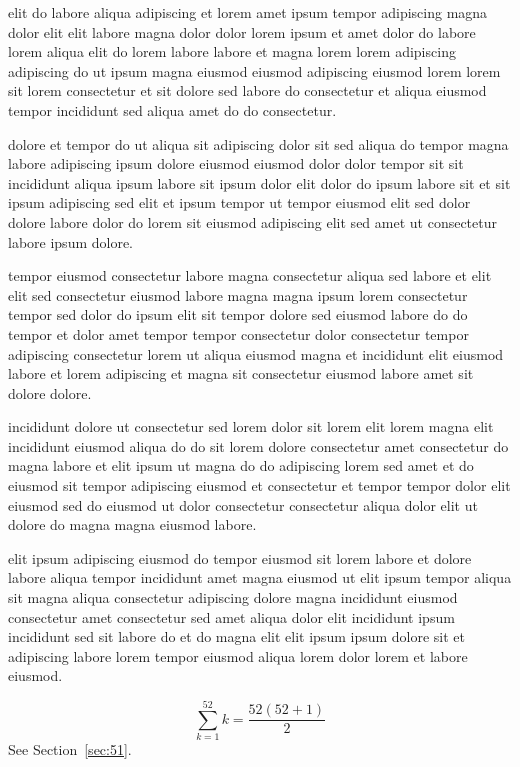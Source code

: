 \documentclass{article}
\begin{document}
elit do labore aliqua adipiscing et lorem amet ipsum tempor adipiscing magna dolor elit elit labore magna dolor dolor lorem ipsum et amet dolor do labore lorem aliqua elit do lorem labore labore et magna lorem lorem adipiscing adipiscing do ut ipsum magna eiusmod eiusmod adipiscing eiusmod lorem lorem sit lorem consectetur et sit dolore sed labore do consectetur et aliqua eiusmod tempor incididunt sed aliqua amet do do consectetur.

dolore et tempor do ut aliqua sit adipiscing dolor sit sed aliqua do tempor magna labore adipiscing ipsum dolore eiusmod eiusmod dolor dolor tempor sit sit incididunt aliqua ipsum labore sit ipsum dolor elit dolor do ipsum labore sit et sit ipsum adipiscing sed elit et ipsum tempor ut tempor eiusmod elit sed dolor dolore labore dolor do lorem sit eiusmod adipiscing elit sed amet ut consectetur labore ipsum dolore.

tempor eiusmod consectetur labore magna consectetur aliqua sed labore et elit elit sed consectetur eiusmod labore magna magna ipsum lorem consectetur tempor sed dolor do ipsum elit sit tempor dolore sed eiusmod labore do do tempor et dolor amet tempor tempor consectetur dolor consectetur tempor adipiscing consectetur lorem ut aliqua eiusmod magna et incididunt elit eiusmod labore et lorem adipiscing et magna sit consectetur eiusmod labore amet sit dolore dolore.

incididunt dolore ut consectetur sed lorem dolor sit lorem elit lorem magna elit incididunt eiusmod aliqua do do sit lorem dolore consectetur amet consectetur do magna labore et elit ipsum ut magna do do adipiscing lorem sed amet et do eiusmod sit tempor adipiscing eiusmod et consectetur et tempor tempor dolor elit eiusmod sed do eiusmod ut dolor consectetur consectetur aliqua dolor elit ut dolore do magna magna eiusmod labore.

elit ipsum adipiscing eiusmod do tempor eiusmod sit lorem labore et dolore labore aliqua tempor incididunt amet magna eiusmod ut elit ipsum tempor aliqua sit magna aliqua consectetur adipiscing dolore magna incididunt eiusmod consectetur amet consectetur sed amet aliqua dolor elit incididunt ipsum incididunt sed sit labore do et do magna elit elit ipsum ipsum dolore sit et adipiscing labore lorem tempor eiusmod aliqua lorem dolor lorem et labore eiusmod.

\begin{equation} \sum_{k=1}^{52} k = \frac{52(52+1)}{2} \end{equation}
See Section~\ref{sec:51}.
\end{document}
